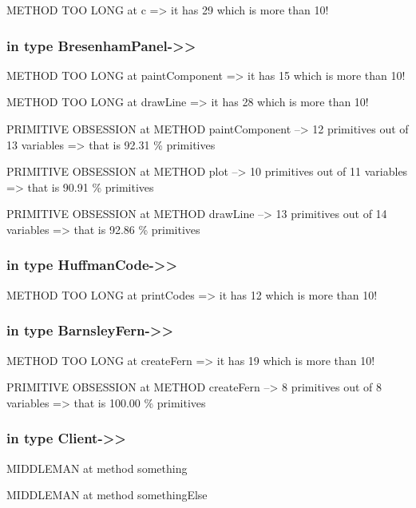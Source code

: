 \documentclass[a4paper]{article}
\begin{document}
\begin{flushleft}
	METHOD TOO LONG at c =\textgreater{} it has 29 which is more than 10!

	\subsubsection{in type
		BresenhamPanel-\textgreater{}\textgreater{}}\label{in-type-bresenhampanel-}

	METHOD TOO LONG at paintComponent =\textgreater{} it has 15 which is
	more than 10!

	METHOD TOO LONG at drawLine =\textgreater{} it has 28 which is more than
	10!

	PRIMITIVE OBSESSION at METHOD paintComponent --\textgreater{} 12
	primitives out of 13 variables =\textgreater{} that is 92.31 \%
	primitives

	PRIMITIVE OBSESSION at METHOD plot --\textgreater{} 10 primitives out of
	11 variables =\textgreater{} that is 90.91 \% primitives

	PRIMITIVE OBSESSION at METHOD drawLine --\textgreater{} 13 primitives
	out of 14 variables =\textgreater{} that is 92.86 \% primitives

	\subsubsection{in type
		HuffmanCode-\textgreater{}\textgreater{}}\label{in-type-huffmancode-}

	METHOD TOO LONG at printCodes =\textgreater{} it has 12 which is more
	than 10!

	\subsubsection{in type
		BarnsleyFern-\textgreater{}\textgreater{}}\label{in-type-barnsleyfern-}

	METHOD TOO LONG at createFern =\textgreater{} it has 19 which is more
	than 10!

	PRIMITIVE OBSESSION at METHOD createFern --\textgreater{} 8 primitives
	out of 8 variables =\textgreater{} that is 100.00 \% primitives

	\subsubsection{in type
		Client-\textgreater{}\textgreater{}}\label{in-type-client-}

	MIDDLEMAN at method something

	MIDDLEMAN at method somethingElse


\end{flushleft}
\end{document}
